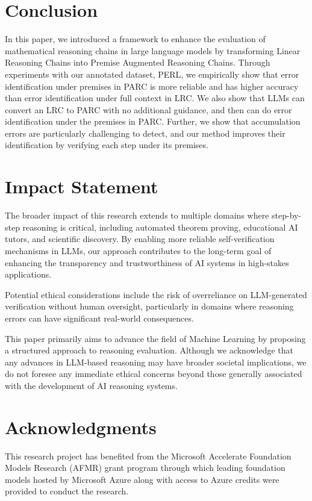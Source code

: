 \vspace{-2ex}
\section{Conclusion}
In this paper, we introduced a framework to enhance the evaluation of mathematical reasoning chains in large language models by transforming Linear Reasoning Chains into Premise Augmented Reasoning Chains. Through experiments with our annotated dataset, PERL, we empirically show that error identification under premises in PARC is more reliable and has higher accuracy than error identification under full context in LRC. We also show that LLMs can convert an LRC to PARC with no additional guidance, and then can do error identification under the premises in PARC. Further, we show that accumulation errors are particularly challenging to detect, and our method improves their identification by verifying each step under its premises.
\section{Impact Statement}
The broader impact of this research extends to multiple domains where step-by-step reasoning is critical, including automated theorem proving, educational AI tutors, and scientific discovery. By enabling more reliable self-verification mechanisms in LLMs, our approach contributes to the long-term goal of enhancing the transparency and trustworthiness of AI systems in high-stakes applications.

Potential ethical considerations include the risk of overreliance on LLM-generated verification without human oversight, particularly in domains where reasoning errors can have significant real-world consequences. 

This paper primarily aims to advance the field of Machine Learning by proposing a structured approach to reasoning evaluation. Although we acknowledge that any advances in LLM-based reasoning may have broader societal implications, we do not foresee any immediate ethical concerns beyond those generally associated with the development of AI reasoning systems.
\section{Acknowledgments}
This research project has benefited from the Microsoft Accelerate Foundation Models Research (AFMR) grant program through which leading foundation models hosted by Microsoft Azure along with access to Azure credits were provided to conduct the research.


